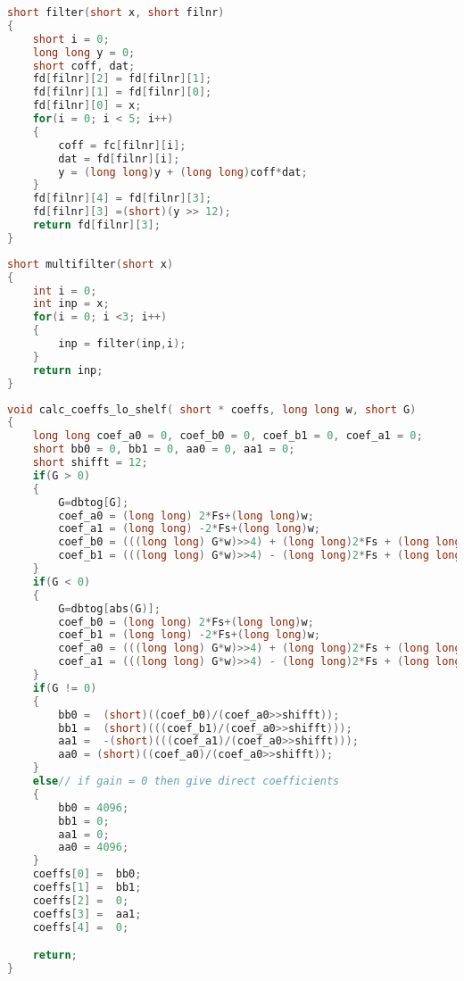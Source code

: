 \begin{lstlisting}[caption={Implementation of generic second order filter.},language=C,label={apcode:func_filter},tabsize=2]
short filter(short x, short filnr)
{
    short i = 0;
    long long y = 0;
    short coff, dat;
    fd[filnr][2] = fd[filnr][1];
    fd[filnr][1] = fd[filnr][0];
    fd[filnr][0] = x;
    for(i = 0; i < 5; i++)
    {
        coff = fc[filnr][i];
        dat = fd[filnr][i];
        y = (long long)y + (long long)coff*dat;
    }
    fd[filnr][4] = fd[filnr][3];
    fd[filnr][3] =(short)(y >> 12);
    return fd[filnr][3];
}
\end{lstlisting}
\begin{lstlisting}[caption={Function that keeps track of multiple filters.},language=C,label={apcode:mult_func_filter},tabsize=2]
short multifilter(short x)
{
    int i = 0;
    int inp = x;
    for(i = 0; i <3; i++)
    {
        inp = filter(inp,i);
    }
    return inp;
}
\end{lstlisting}
\begin{lstlisting}[caption={Calculate low frequency shelving filter coefficients.},language=C,label={apcode:calc_lo_filt},tabsize=2]
void calc_coeffs_lo_shelf( short * coeffs, long long w, short G)
{
    long long coef_a0 = 0, coef_b0 = 0, coef_b1 = 0, coef_a1 = 0;
    short bb0 = 0, bb1 = 0, aa0 = 0, aa1 = 0;
    short shifft = 12;
    if(G > 0)
    {
        G=dbtog[G];
        coef_a0 = (long long) 2*Fs+(long long)w;
        coef_a1 = (long long) -2*Fs+(long long)w;
        coef_b0 = (((long long) G*w)>>4) + (long long)2*Fs + (long long)w;
        coef_b1 = (((long long) G*w)>>4) - (long long)2*Fs + (long long)w;
    }
    if(G < 0)
    {
        G=dbtog[abs(G)];
        coef_b0 = (long long) 2*Fs+(long long)w;
        coef_b1 = (long long) -2*Fs+(long long)w;
        coef_a0 = (((long long) G*w)>>4) + (long long)2*Fs + (long long)w;
        coef_a1 = (((long long) G*w)>>4) - (long long)2*Fs + (long long)w;
    }
    if(G != 0)
    {
        bb0 =  (short)((coef_b0)/(coef_a0>>shifft));
        bb1 =  (short)(((coef_b1)/(coef_a0>>shifft)));
        aa1 =  -(short)(((coef_a1)/(coef_a0>>shifft)));
        aa0 = (short)((coef_a0)/(coef_a0>>shifft));
    }
    else// if gain = 0 then give direct coefficients
    {
        bb0 = 4096;
        bb1 = 0;
        aa1 = 0;
        aa0 = 4096;
    }
    coeffs[0] =  bb0;
    coeffs[1] =  bb1;
    coeffs[2] =  0;
    coeffs[3] =  aa1;
    coeffs[4] =  0;

    return;
}
\end{lstlisting}
